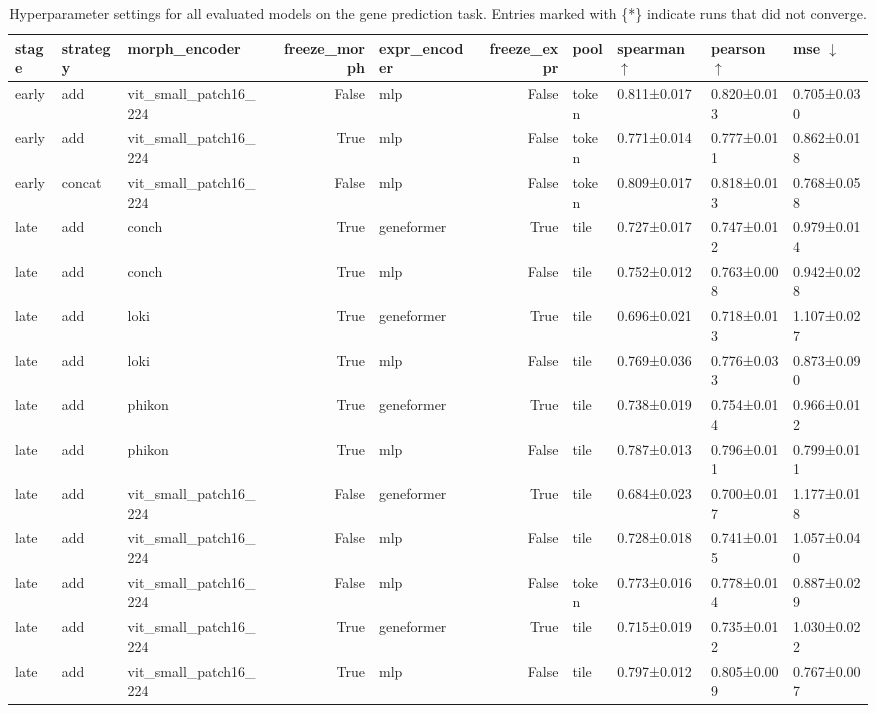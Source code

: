 \begin{table}
  \centering
  \scriptsize
\caption{Hyperparameter settings for all evaluated models on the gene prediction task. Entries marked with \{*\} indicate runs that did not converge.}
\label{tab:p-fus:gene-table}
\begin{tabular}{lllrlrllll}
\toprule
stage & strategy & morph\_encoder & freeze\_morph & expr\_encoder & freeze\_expr & pool & spearman $\uparrow$ & pearson $\uparrow$ & mse $\downarrow$\\
\midrule
early & add & vit\_small\_patch16\_224 & False & mlp & False & token & 0.811±0.017 & 0.820±0.013 & 0.705±0.030 \\
early & add & vit\_small\_patch16\_224 & True & mlp & False & token & 0.771±0.014 & 0.777±0.011 & 0.862±0.018 \\
early & concat & vit\_small\_patch16\_224 & False & mlp & False & token & 0.809±0.017 & 0.818±0.013 & 0.768±0.058 \\
late & add & conch & True & geneformer & True & tile & 0.727±0.017 & 0.747±0.012 & 0.979±0.014 \\
late & add & conch & True & mlp & False & tile & 0.752±0.012 & 0.763±0.008 & 0.942±0.028 \\
late & add & loki & True & geneformer & True & tile & 0.696±0.021 & 0.718±0.013 & 1.107±0.027 \\
late & add & loki & True & mlp & False & tile & 0.769±0.036 & 0.776±0.033 & 0.873±0.090 \\
late & add & phikon & True & geneformer & True & tile & 0.738±0.019 & 0.754±0.014 & 0.966±0.012 \\
late & add & phikon & True & mlp & False & tile & 0.787±0.013 & 0.796±0.011 & 0.799±0.011 \\
late & add & vit\_small\_patch16\_224 & False & geneformer & True & tile & 0.684±0.023 & 0.700±0.017 & 1.177±0.018 \\
late & add & vit\_small\_patch16\_224 & False & mlp & False & tile & 0.728±0.018 & 0.741±0.015 & 1.057±0.040 \\
late & add & vit\_small\_patch16\_224 & False & mlp & False & token & 0.773±0.016 & 0.778±0.014 & 0.887±0.029 \\
late & add & vit\_small\_patch16\_224 & True & geneformer & True & tile & 0.715±0.019 & 0.735±0.012 & 1.030±0.022 \\
late & add & vit\_small\_patch16\_224 & True & mlp & False & tile & 0.797±0.012 & 0.805±0.009 & 0.767±0.007 \\

\end{tabular}
\end{table}
